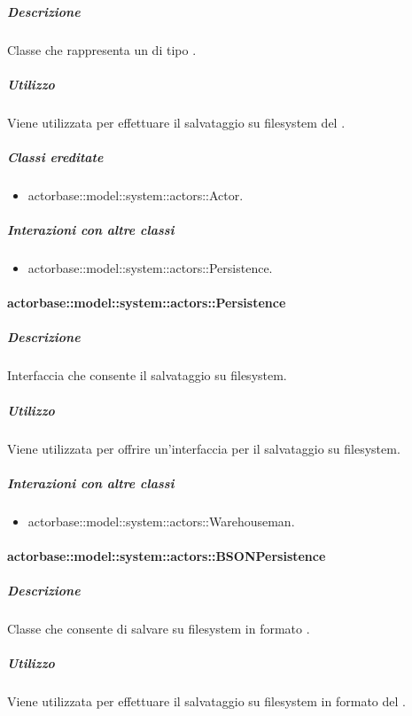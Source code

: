 \documentclass{scalatekids-article}
\begin{document}
\subparagraph{Descrizione}

Classe che rappresenta un  di tipo .

\subparagraph{Utilizzo}

Viene utilizzata per effettuare il salvataggio su filesystem del
.

\subparagraph{Classi ereditate}

\begin{itemize}
\item actorbase::model::system::actors::Actor.
\end{itemize}

\subparagraph{Interazioni con altre classi}

\begin{itemize}
\item actorbase::model::system::actors::Persistence.
\end{itemize}

\paragraph{actorbase::model::system::actors::Persistence}

\subparagraph{Descrizione}

Interfaccia che consente il salvataggio su filesystem.

\subparagraph{Utilizzo}

Viene utilizzata per offrire un'interfaccia per il salvataggio su filesystem.

\subparagraph{Interazioni con altre classi}

\begin{itemize}
\item actorbase::model::system::actors::Warehouseman.
\end{itemize}

\paragraph{actorbase::model::system::actors::BSONPersistence}

\subparagraph{Descrizione}

Classe che consente di salvare su filesystem in formato .

\subparagraph{Utilizzo}

Viene utilizzata per effettuare il salvataggio su filesystem in formato
 del .
\end{document}
